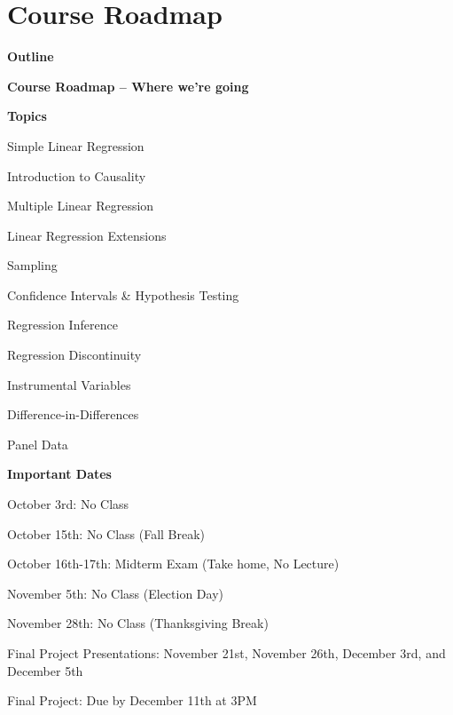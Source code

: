 \documentclass[11pt, aspectratio=169]{beamer}
\newenvironment{wideitemize}{\itemize\addtolength{\itemsep}{5pt}}{\enditemize}
\newenvironment{wideenumerate}{\enumerate\addtolength{\itemsep}{5pt}}{\endenumerate}
\begin{document}
\section{Course Roadmap}
	\begin{frame}{\bf \large Outline}
	\tableofcontents[currentsection]
\end{frame}
\begin{frame}{\bf \large Course Roadmap -- Where we're going}

\begin{minipage}{.5\textwidth}
\begin{wideitemize}
	\item \textbf{Topics}
	\begin{wideenumerate}
		\item Simple Linear Regression 
		\item Introduction to Causality
		\item Multiple Linear Regression
		\item Linear Regression Extensions
		\item Sampling
		\item Confidence Intervals \& Hypothesis Testing
		\item Regression Inference
		\item Regression Discontinuity
		\item Instrumental Variables
		\item Difference-in-Differences
		\item Panel Data
	\end{wideenumerate}
\end{wideitemize}
\end{minipage}\pause%
\begin{minipage}{.5\textwidth}
	\begin{wideitemize}
		\item \textbf{Important Dates}
		\begin{wideitemize}
			\item	October 3rd: No Class
			\item	October 15th: No Class (Fall Break)
			\item	October 16th-17th: Midterm Exam (Take home, No Lecture)
			\item	November 5th: No Class (Election Day)
			\item	November 28th: No Class (Thanksgiving Break)
			\item	Final Project Presentations: November 21st, November 26th, December 3rd, and December 5th 
			\item Final Project: Due by December 11th at 3PM
		\end{wideitemize}
	\end{wideitemize}
\end{minipage}
\end{frame}

\end{document}
